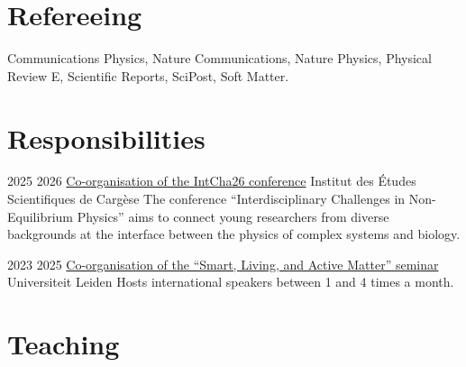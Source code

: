 \documentclass[a4paper]{cvtemplate_en} %
\begin{document}
\section{Refereeing}

Communications Physics, Nature Communications, Nature Physics, Physical Review E,  Scientific Reports, SciPost, Soft Matter.
\vspace{25pt}


\section{Responsibilities}

\begin{cvbody}

\cvitem
    {2025}
    {2026}
    {\href{https://intcha26.sciencesconf.org}{Co-organisation of the IntCha26 conference}}
    {Institut des \'Etudes Scientifiques de Cargèse }
    {}{}{}
    {}
    {The conference ``Interdisciplinary Challenges in Non-Equilibrium Physics'' aims to connect young researchers from diverse backgrounds at the interface between the physics of complex systems and biology.\vspace{5pt}}

\cvitem
	{2023}
	{2025}
	{\href{https://slam-leiden.nl}{Co-organisation of the ``Smart, Living, and Active Matter'' seminar}}
	{Universiteit Leiden }
	{}{}{}
    {}
	{Hosts international speakers between 1 and 4 times a month.\vspace{12.5pt}}

\end{cvbody}


\section{Teaching}
\end{document}
